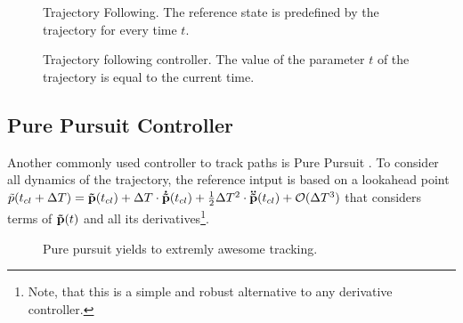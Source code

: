\begin{figure}[h]
    \centering
    \def\svgwidth{0.4\columnwidth}
    
    \caption{Trajectory Following. The reference state is predefined by the trajectory for every time $t$.}
    \label{fig:scene_trajectoryFollowing}
\end{figure}

\begin{figure}[h]
    \centering
    \def\svgwidth{\columnwidth}
    
    \caption{Trajectory following controller. The value of the parameter $t$ of the trajectory is equal to the current time.}
    \label{fig:trajectoryfollowing}
\end{figure}



\subsection{Pure Pursuit Controller}
Another commonly used controller to track paths is Pure Pursuit \cite{snider}. To consider all dynamics of the trajectory, the reference intput is based on a lookahead point $\tilde{p}(t_{cl}+\Delta T) = {\bf \tilde{p}}(t_{cl}) + \Delta T \cdot {\bf\dot{ \tilde{p}}}(t_{cl}) + \frac{1}{2} \Delta T^2 \cdot {\bf\ddot{ \tilde{p}}}(t_{cl}) + \mathcal{O}(\Delta T^3)$ that considers terms of ${\bf \tilde{p}}(t)$ and all its derivatives\footnote{Note, that this is a simple and robust alternative to any derivative controller.}.

\begin{figure}[h]
    \centering
    \def\svgwidth{0.5\columnwidth}
    
    \caption{Pure pursuit yields to extremly awesome tracking.}
    \label{fig:scene_purePursuit}
\end{figure}

